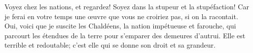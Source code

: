 Voyez chez les nations, et regardez! Soyez dans la stupeur et la stupéfaction!
	Car je ferai en votre temps une œuvre que vous ne croiriez pas, si on la racontait.
Oui, voici que je suscite les Chaldéens, la nation impétueuse et farouche,
	qui parcourt les étendues de la terre pour s’emparer des demeures d’autrui.
Elle est terrible et redoutable; c’est elle qui se donne son droit et sa grandeur.

